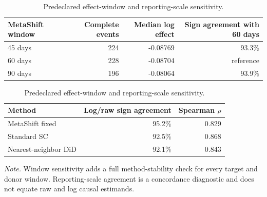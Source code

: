 \begin{table}[tbp]
\centering
\caption{Predeclared effect-window and reporting-scale sensitivity.}
\label{tab:window-scale-sensitivity}
\small
\begin{tabular}{lrrr}
\toprule
MetaShift window & Complete events & Median log effect & Sign agreement with 60 days \\
\midrule
45 days & 224 & -0.08769 & 93.3\% \\
60 days & 228 & -0.08704 & reference \\
90 days & 196 & -0.08064 & 93.9\% \\
\bottomrule
\end{tabular}
\par\medskip
\begin{tabular}{lrr}
\toprule
Method & Log/raw sign agreement & Spearman $\rho$ \\
\midrule
MetaShift fixed & 95.2\% & 0.829 \\
Standard SC & 92.5\% & 0.868 \\
Nearest-neighbor DiD & 92.1\% & 0.843 \\
\bottomrule
\end{tabular}
\par\smallskip
\begin{minipage}{0.94\linewidth}
\footnotesize\textit{Note.} Window sensitivity adds a full method-stability check for every target and donor window. Reporting-scale agreement is a concordance diagnostic and does not equate raw and log causal estimands.
\end{minipage}
\end{table}
